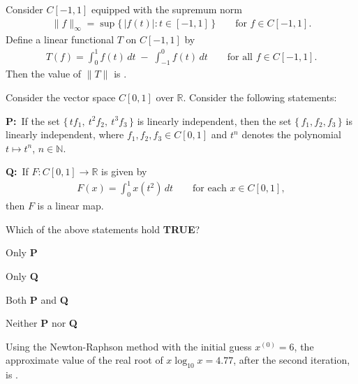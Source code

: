 \documentclass[journal,12pt,onecolumn]{IEEEtran}
\theoremstyle{remark}
\begin{document}
\begin{enumerate}
{\hfill{}

\item Consider $C[-1,1]$ equipped with the supremum norm
\begin{align*}
\|f\|_{\infty}=\sup\{\,|f(t)|:t\in[-1,1]\,\}\qquad\text{for }f\in C[-1,1].
\end{align*}
Define a linear functional $T$ on $C[-1,1]$ by
\begin{align*}
T(f)=\int_{0}^{1} f(t)\,dt\;-\;\int_{-1}^{0} f(t)\,dt
\qquad\text{for all }f\in C[-1,1].
\end{align*}
Then the value of $\|T\|$ is \underline{\hspace{3cm}}.

\hfill{}

\item Consider the vector space $C[0,1]$ over $\mathbb{R}$.  Consider the following statements:



\textbf{P:}\ If the set $\{\,t f_1,\ t^{2} f_2,\ t^{3} f_3\,\}$ is linearly independent, then the set
$\{\,f_1,f_2,f_3\,\}$ is linearly independent, where $f_1,f_2,f_3\in C[0,1]$ and $t^{n}$ denotes the
polynomial $t\mapsto t^{n}$, $n\in\mathbb{N}$.


\textbf{Q:}\ If $F:C[0,1]\to\mathbb{R}$ is given by
\begin{align*}
F(x)=\int_{0}^{1} x(t^{2})\,dt\qquad\text{for each }x\in C[0,1],
\end{align*}
then $F$ is a linear map.


Which of the above statements hold \textbf{TRUE}?

\hfill{}

\begin{enumerate}
\begin{multicols}{2}
\item Only \textbf{P}
\item Only \textbf{Q}
\item Both \textbf{P} and \textbf{Q}
\item Neither \textbf{P} nor \textbf{Q}
\end{multicols}
\end{enumerate}

\item Using the Newton-Raphson method with the initial guess \(x^{(0)}=6\),
the approximate value of the real root of \(x\log_{10}x=4.77\), after the
second iteration, is \underline{\hspace{3.2cm}}.

}
\end{enumerate}
\end{document}
